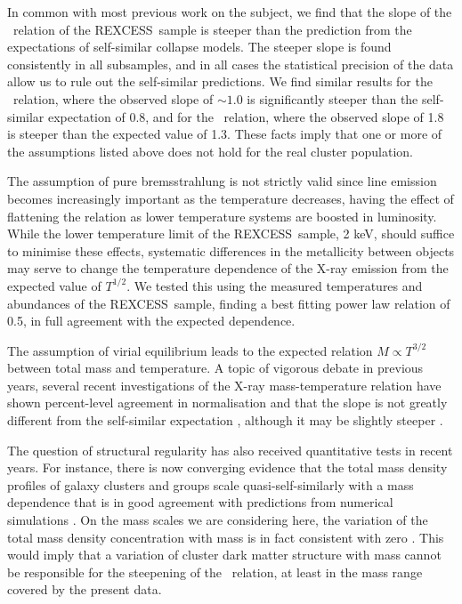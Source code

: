 \documentclass[oldversion]{aa}
\newcommand{\rexcess}{{\gwpfont REXCESS}}
\begin{document}
In common with most previous work on the subject, we find that the
slope of the \LxT\ relation of the \rexcess\ sample is steeper
than the prediction from the expectations of self-similar collapse
models. The steeper slope is found consistently in all subsamples, and
in all cases the statistical precision of the data allow us to rule
out the self-similar predictions. We find similar results for the
\LxYx\ relation, where the observed slope of $\sim 1.0$ is
significantly steeper than the self-similar expectation of 0.8, and
for the \LxM\ relation, where the observed slope of 1.8 is steeper
than the expected value of 1.3. These facts imply that one or more of
the assumptions listed above does not hold for the real cluster
population.

The assumption of pure bremsstrahlung is not strictly valid since line
emission becomes increasingly important as the temperature decreases,
having the effect of flattening the relation as lower temperature
systems are boosted in luminosity. While the lower temperature limit
of the \rexcess\ sample, 2 keV, should suffice to minimise these
effects, systematic differences in the metallicity between objects may
serve to change the temperature dependence of the X-ray emission from
the expected value of $T^{1/2}$. We tested this using the measured
temperatures and abundances of the \rexcess\ sample, finding a best fitting power law relation of 0.5, in full agreement with the expected dependence.

The assumption of virial equilibrium leads to the expected relation $M
\propto T^{3/2}$ between total mass and temperature. A topic of vigorous debate in previous years, several recent
investigations of the X-ray mass-temperature relation have shown percent-level agreement in normalisation and that
the slope is not greatly different from the self-similar
expectation \citep{app05,vikh06}, although it may be slightly steeper \citep{app05,sun08}.

The question of structural regularity has also received quantitative tests
in recent years. For instance, there is now converging evidence that the total mass density profiles of galaxy clusters and groups scale
quasi-self-similarly with a mass dependence that is in good agreement
with predictions from numerical simulations
\citep[eg.,][]{pap05,vikh06,gasta07}. On the mass scales we are
considering here, the variation of the total mass density
concentration with mass is in fact consistent with zero
\citep{pap05,vikh06}. This would imply that a variation of cluster
dark matter structure with mass cannot be responsible for the
steepening of the \LxT\ relation, at least in the mass range covered by the present data.
\end{document}
